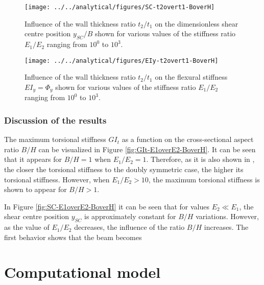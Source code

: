 \begin{figure}[!htpb] %
  \centering
  \texttt{[image: ../../analytical/figures/SC-t2overt1-BoverH]}
  \caption[Influence of the wall thickness ratio $t_2/t_1$ on the dimensionless shear centre position $y_{SC}/B$]{Influence of the wall thickness ratio $t_2/t_1$ on the dimensionless shear centre position $y_{SC}/B$ shown for various values of the stiffness ratio $E_1/E_2$ ranging from $10^0$ to $10^3$. }\label{fig:SC-t2overt1-BoverH}
\end{figure}

\begin{figure}[!htpb] %
  \centering
  \texttt{[image: ../../analytical/figures/EIy-t2overt1-BoverH]}
  \caption[Influence of the wall thickness ratio $t_2/t_1$ on the flexural stiffness $EI_y$]{Influence of the wall thickness ratio $t_2/t_1$ on the flexural stiffness $EI_y = \Phi_y$ shown for various values of the stiffness ratio $E_1/E_2$ ranging from $10^0$ to $10^3$. }\label{fig:EIy-t2overt1-BoverH}
\end{figure}

\subsubsection{Discussion of the results} \label{subsubsec:results_parametricStudy}

The maximum torsional stiffness $G I_t$ as a function on the cross-sectional aspect ratio $B/H$ can be visualized in Figure \ref{fig:GIt-E1overE2-BoverH}. It can be seen that it appears for $B/H = 1$ when $E_1/E_2 = 1$. Therefore, as it is also shown in \cite{Raither_basic}, the closer the torsional stiffness to the doubly symmetric case, the higher its torsional stiffness. However, when $E_1/E_2 > 10$, the maximum torsional stiffness is shown to appear for $B/H > 1$.

In Figure \ref{fig:SC-E1overE2-BoverH} it can be seen that for values $E_2 \ll E_1$, the shear centre position $y_{SC}$ is approximately constant for $B/H$ variations. However, as the value of $E_1/E_2$ decreases, the influence of the ratio $B/H$ increases. The first behavior shows that the beam becomes  


\section{Computational model} \label{sec:computationalModel}

% 